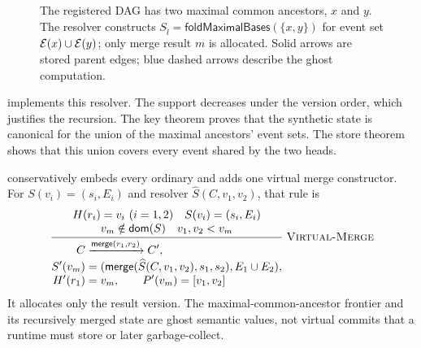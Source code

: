 \begin{figure}[H]
\centering
{}
\caption{The registered DAG has two maximal common ancestors, $x$ and $y$.
The resolver constructs
$S_{\widehat l}=\mathsf{foldMaximalBases}(\{x,y\})$ for event set
$\events(x)\cup\events(y)$; only merge result $m$ is allocated. Solid arrows
are stored parent edges; blue dashed arrows describe the ghost computation.}
\label{fig:virtual-base}
\end{figure}

 implements this resolver. The support decreases
under the version order, which justifies the recursion. The key theorem
 proves that the synthetic state is canonical
for the union of the maximal ancestors' event sets. The store theorem
 shows that this union
covers every event shared by the two heads.

 conservatively embeds every ordinary  and adds one
virtual merge constructor. For
$S(v_i)=(s_i,E_i)$ and resolver $\widehat S(C,v_1,v_2)$, that rule is
\[
\Rule{Virtual-Merge}{
 H(r_i)=v_i\ (i=1,2)\quad S(v_i)=(s_i,E_i)
 \\
 v_m\notin\mathsf{dom}(S)\quad v_1,v_2<v_m
}{
 \begin{aligned}
 C&\xrightarrow{\mathsf{merge}(r_1,r_2)}C',\\[-1mm]
 S'(v_m)&=(\merge(\widehat S(C,v_1,v_2),s_1,s_2),E_1\cup E_2),\\[-1mm]
 H'(r_1)&=v_m,\qquad P'(v_m)=[v_1,v_2]
 \end{aligned}
}
\]
It allocates only the result version. The maximal-common-ancestor frontier and
its recursively merged state are ghost semantic values, not virtual commits
that a runtime must store or later garbage-collect.


